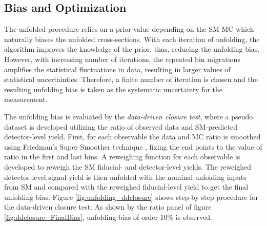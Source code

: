 \subsection{Bias and Optimization}
\label{subsec:Bias}

The unfolded procedure relies on a prior value depending on the SM MC which naturally biases the unfolded cross-sections. With each iteration of unfolding, the algorithm improves the knowledge of the prior, thus, reducing the unfolding bias. However, with increasing number of iterations, the repeated bin migrations amplifies the statistical fluctuations in data, resulting in larger values of statistical uncertainties. Therefore, a finite number of iteration is chosen and the resulting unfolding bias is taken as the systematic uncertainty for the measurement. 

The unfolding bias is evaluated by the \textit{data-driven closure test}, where a pseudo dataset is developed utilizing the ratio of observed data and SM-predicted detector-level yield. First, for each observable the data and MC ratio is smoothed using Friedman's Super Smoother technique \cite{FriedmanSmoother}, fixing the end points to the value of ratio in the first and last bins. A reweighing function for each observable is developed to reweigh the SM fiducial- and detector-level yields. The reweighed detector-level signal-yield is then unfolded with the nominal unfolding inputs from SM and compared with the reweighed fiducial-level yield to get the final unfolding bias. Figure \ref{fig:unfolding_ddclosure} shows step-by-step procedure for the data-driven closure test. As shown by the ratio panel of figure \ref{fig:ddclosure_FinalBias}, unfolding bias of order $10\%$ is observed. 

